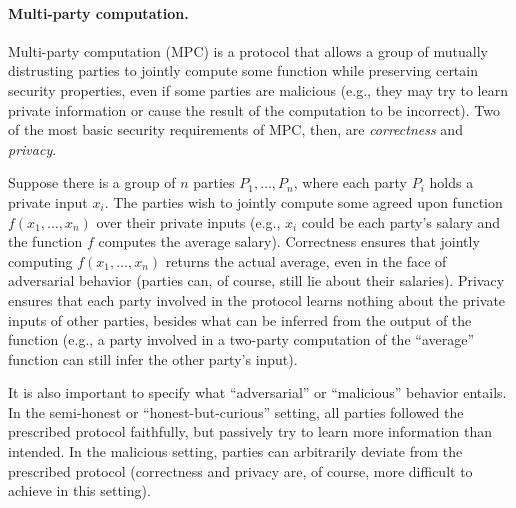\paragraph{Multi-party computation.}

Multi-party computation (MPC) is a protocol that allows a group of mutually
distrusting parties to jointly compute some function while preserving certain
security properties, even if some parties are malicious (e.g., they may try to
learn private information or cause the result of the computation to be
incorrect). Two of the most basic security requirements of MPC, then, are
\emph{correctness} and \emph{privacy}.

Suppose there is a group of $n$ parties $P_1, \ldots, P_n$, where each party
$P_i$ holds a private input $x_i$. The parties wish to jointly compute some
agreed upon function $f(x_1, \ldots, x_n)$ over their private inputs (e.g.,
$x_i$ could be each party's salary and the function $f$ computes the average
salary). Correctness ensures that jointly computing $f(x_1, \ldots, x_n)$
returns the actual average, even in the face of adversarial behavior (parties
can, of course, still lie about their salaries). Privacy ensures that each party
involved in the protocol learns nothing about the private inputs of other
parties, besides what can be inferred from the output of the function (e.g., a
party involved in a two-party computation of the ``average'' function can still
infer the other party's input).

It is also important to specify what ``adversarial'' or ``malicious'' behavior
entails. In the semi-honest or ``honest-but-curious'' setting, all parties
followed the prescribed protocol faithfully, but passively try to learn more
information than intended. In the malicious setting, parties can arbitrarily
deviate from the prescribed protocol (correctness and privacy are, of course,
more difficult to achieve in this setting).

